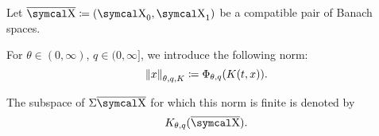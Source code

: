 \begin{definition}\label{def:k_functional_interpolation_space}
  Let \( \Ol{\CX} \coloneqq ( \CX_0, \CX_1 ) \) be a compatible pair of Banach spaces.

  For \( \theta \in (0, \infty) \), \( q \in (0, \infty] \), we introduce the following norm:
  \begin{equation}\label{eq:def:k_functional_interpolation_space/norm}
    \left\Vert x \right\Vert_{\theta,q,K} \coloneqq \Phi_{\theta,q}(K(t, x)).
  \end{equation}

  The subspace of \( \Sigma\Ol{\CX} \) for which this norm is finite is denoted by
  \begin{equation*}
    K_{\theta,q}(\Ol{\CX}).
  \end{equation*}
\end{definition}

